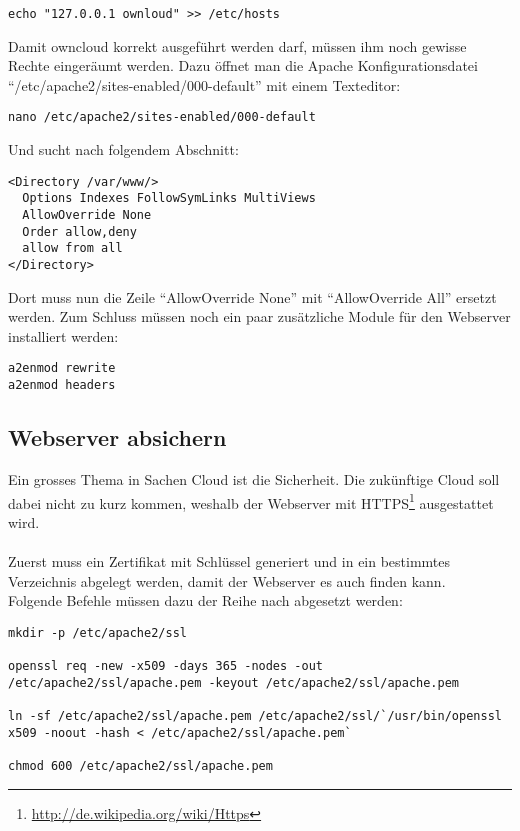 \begin{lstlisting}
echo "127.0.0.1 ownloud" >> /etc/hosts
\end{lstlisting}

Damit owncloud korrekt ausgeführt werden darf, müssen ihm noch gewisse Rechte eingeräumt werden. Dazu öffnet man die Apache Konfigurationsdatei ``/etc/apache2/sites-enabled/000-default'' mit einem Texteditor:
\\

\begin{lstlisting}
nano /etc/apache2/sites-enabled/000-default
\end{lstlisting}

Und sucht nach folgendem Abschnitt:
\\

\begin{lstlisting}
<Directory /var/www/>
  Options Indexes FollowSymLinks MultiViews
  AllowOverride None
  Order allow,deny
  allow from all
</Directory>
\end{lstlisting}

Dort muss nun die Zeile ``AllowOverride None'' mit ``AllowOverride All'' ersetzt werden. Zum Schluss müssen noch ein paar zusätzliche Module für den Webserver installiert werden:
\\
\begin{lstlisting}
a2enmod rewrite
a2enmod headers
\end{lstlisting}

\subsection{Webserver absichern}
Ein grosses Thema in Sachen Cloud ist die Sicherheit. Die zukünftige Cloud soll dabei nicht zu kurz kommen, weshalb der Webserver mit HTTPS\footnote{\url{http://de.wikipedia.org/wiki/Https}} ausgestattet wird.
\\
\\
Zuerst muss ein Zertifikat mit Schlüssel generiert und in ein bestimmtes Verzeichnis abgelegt werden, damit der Webserver es auch finden kann.
\\
Folgende Befehle müssen dazu der Reihe nach abgesetzt werden:
\\

\begin{lstlisting}
mkdir -p /etc/apache2/ssl

openssl req -new -x509 -days 365 -nodes -out /etc/apache2/ssl/apache.pem -keyout /etc/apache2/ssl/apache.pem

ln -sf /etc/apache2/ssl/apache.pem /etc/apache2/ssl/`/usr/bin/openssl x509 -noout -hash < /etc/apache2/ssl/apache.pem`

chmod 600 /etc/apache2/ssl/apache.pem
\end{lstlisting}

